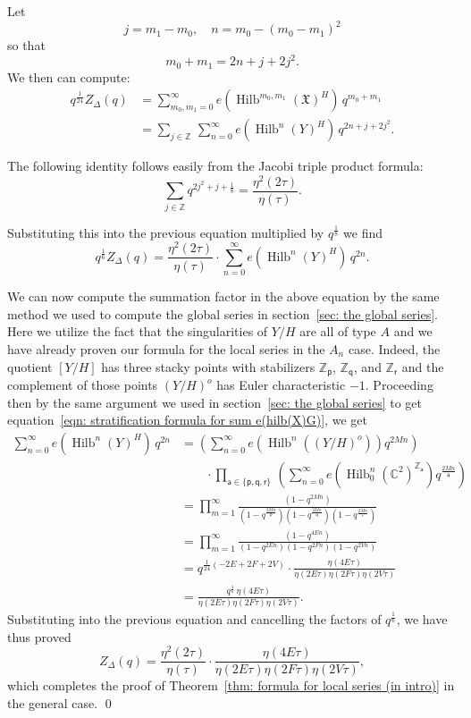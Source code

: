 \documentclass{amsart}
\theoremstyle{definition}
\newcommand{\CC} {{\mathbb C}}          %
\newcommand{\ZZ} {{\mathbb Z}}		%
\newcommand{\X}{\mathfrak{X}}
\newcommand{\varp}{\mathsf{p}}
\newcommand{\varq}{\mathsf{q}}
\newcommand{\varr}{\mathsf{r}}
\newcommand{\vara}{\mathsf{a}}
\newcommand{\Hilb}{\operatorname{Hilb}}
\begin{document}
Let
\[
j=m_{1}-m_{0}, \quad n=m_{0}-(m_{0}-m_{1})^{2} 
\]
so that
\[
m_{0}+m_{1} = 2n +j + 2j^{2}. 
\]
We then can compute:
\begin{align*}
q^{\frac{1}{24}} Z_{\Delta}(q) &= \sum_{m_{0},m_{1}= 0}^{\infty } 
e\left(\Hilb^{m_{0},m_{1}}(\X )^{H} \right) \, q^{m_{0}+m_{1}} \\
&= \sum_{j\in \ZZ}\,  \sum_{n=0}^{\infty} e\left(\Hilb^{n}(Y)^{H}
\right)\, q^{2n+j+2j^{2}}.
\end{align*}

The following identity follows easily from the Jacobi triple product
formula:
\[
\sum_{j\in \ZZ} q^{2j^{2}+j+\frac{1}{8}} = \frac{\eta^{2}(2\tau )}{\eta (\tau )}.
\]

Substituting this into the previous equation multiplied by
$q^{\frac{1}{8}}$ we find
\[
q^{\frac{1}{6}} Z_{\Delta}(q) =  \frac{\eta^{2}(2\tau )}{\eta (\tau )} \cdot
\sum_{n=0}^{\infty}  e\left(\Hilb^{n}(Y)^{H}
\right)\, q^{2n}.
\]

We can now compute the summation factor in the above equation by the
same method we used to compute the global series in section~\ref{sec:
the global series}. Here we utilize the fact that the singularities of
$Y/H$ are all of type $A$ and we have already proven our formula for
the local series in the $A_{n}$ case. Indeed, the quotient $[Y/H]$ has
three stacky points with stabilizers $\ZZ_{\varp}$, $\ZZ_{\varq}$, and
$\ZZ_{\varr}$ and the complement of those points $(Y/H)^{o}$ has Euler
characteristic $-1$. Proceeding then by the same argument we used in
section~\ref{sec: the global series} to get equation~\eqref{eqn:
stratification formula for sum e(hilb(X)G)}, we get
\begin{align*}
\sum_{n=0}^{\infty}  e\left(\Hilb^{n}(Y)^{H}\right)\, q^{2n}&=
\left(\sum_{n=0}^{\infty} e\left(\Hilb^{n}\left((Y/H)^{o} \right)
\right) q^{2Mn} \right)  \\
&\quad \quad  \cdot \prod_{\vara \in \{\varp ,\varq
,\varr  \}}\, \left( \sum_{n=0}^{\infty} e\left(\Hilb_{0}^{n}(\CC^{2})^{\ZZ_{\vara }} \right) q^{\frac{2Mn}{\vara }}  \right)\\
&=\prod_{m=1}^{\infty} \frac{\left(1-q^{2Mn} \right)}{\left(1-q^{\frac{2Mn}{\varp}} \right)\left(1-q^{\frac{2Mn}{\varq}} \right)\left(1-q^{\frac{2Mn}{\varr}} \right)}\\
&=\prod_{m=1}^{\infty} \frac{\left(1-q^{4En} \right)}{\left(1-q^{2En} \right)\left(1-q^{2Fn} \right)\left(1-q^{2Vn} \right)}\\
&=q^{\frac{1}{24}(-2E+2F+2V)}\cdot  \frac{\eta (4E\tau )}{\eta (2E\tau )\eta
(2F\tau )\eta (2V\tau )} \\
&=  \frac{q^{\frac{1}{6}}\,\eta (4E\tau )}{\eta (2E\tau )\eta
(2F\tau )\eta (2V\tau )}.
\end{align*}
Substituting into the previous equation and cancelling the factors of
$q^{\frac{1}{6}}$, we have thus proved
\[
Z_{\Delta}(q) =  \frac{\eta^{2}(2\tau )}{\eta (\tau )}\cdot \frac{\eta (4E\tau )}{\eta
(2E\tau )\eta (2F\tau )\eta (2V\tau )},
\]
which completes the proof of Theorem~\ref{thm: formula for local
series (in intro)} in the general case. \qed
\end{document}
